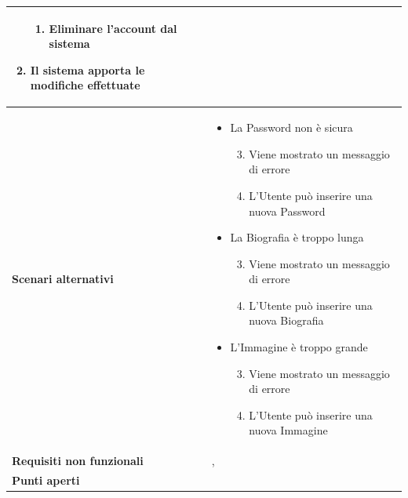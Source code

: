 \documentclass[12pt,a4paper]{report}
\let\oldhyperref\hyperref
\renewcommand{\hyperref}[2][]{\oldhyperref[#1]{\dotuline{#2}}}
\begin{document}
\begin{tabularx}{\textwidth}{|p{3.8cm}|X|}
\begin{enumerate}[nosep, leftmargin=*, before={\vspace{-0.5\baselineskip}}, after={\vspace{-0.8\baselineskip}}]
\begin{enumerate}[nosep, leftmargin=*]
                \item Eliminare l'account dal sistema
            \end{enumerate}
            \item Il sistema apporta le modifiche effettuate
        \end{enumerate} \\ \hline
    \textbf{Scenari alternativi} & 
        \begin{itemize}[nosep, leftmargin=*, before={\vspace{-0.5\baselineskip}}, after={\vspace{-0.8\baselineskip}}]
            \item La Password non è sicura
            \begin{enumerate}[nosep, leftmargin=*]
                \setcounter{enumi}{2}
                \item Viene mostrato un messaggio di errore
                \item L'Utente può inserire una nuova Password
            \end{enumerate}
            \item La Biografia è troppo lunga
            \begin{enumerate}[nosep, leftmargin=*]
                \setcounter{enumi}{2}
                \item Viene mostrato un messaggio di errore
                \item L'Utente può inserire una nuova Biografia
            \end{enumerate}
            \item L'Immagine è troppo grande
            \begin{enumerate}[nosep, leftmargin=*]
                \setcounter{enumi}{2}
                \item Viene mostrato un messaggio di errore
                \item L'Utente può inserire una nuova Immagine
            \end{enumerate}
        \end{itemize} \\ \hline
    \textbf{Requisiti non funzionali} & \hyperref[R06N]{R06N}, \hyperref[R08N]{R08N} \\ \hline
    \textbf{Punti aperti} & \\ \hline
\end{tabularx}

\newpage
\end{document}
